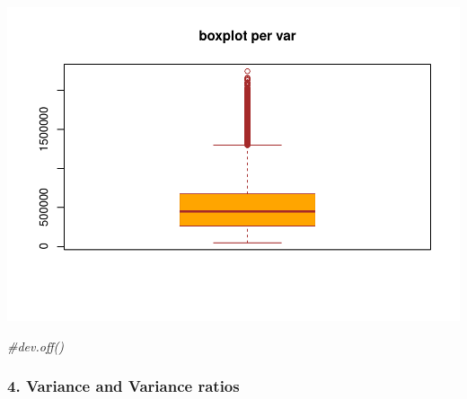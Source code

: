\documentclass[]{article}
\newenvironment{Shaded}{\begin{snugshade}}{\end{snugshade}}
\newcommand{\CommentTok}[1]{\textcolor[rgb]{0.56,0.35,0.01}{\textit{#1}}}
\begin{document}
\includegraphics{Presentation_exploratory_analysis_files/figure-latex/unnamed-chunk-4-1.pdf}

\begin{Shaded}
\begin{Highlighting}[]
\CommentTok{#dev.off()}
\end{Highlighting}
\end{Shaded}

\subsubsection{4. Variance and Variance
ratios}\label{variance-and-variance-ratios}
\end{document}
